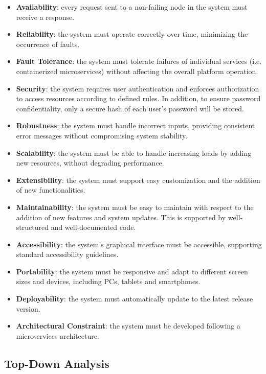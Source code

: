 \begin{itemize}
  \item \textbf{Availability}: every request sent to a non-failing node in the system must receive a response.
  \item \textbf{Reliability}: the system must operate correctly over time, minimizing the occurrence of faults.
  \item \textbf{Fault Tolerance}: the system must tolerate failures of individual services (i.e. containerized microservices) without affecting the overall platform operation.
  \item \textbf{Security}: the system requires user authentication and enforces authorization to access resources according to defined rules. In addition, to ensure password confidentiality, only a secure hash of each user's password will be stored.
  \item \textbf{Robustness}: the system must handle incorrect inputs, providing consistent error messages without compromising system stability.
  \item \textbf{Scalability}: the system must be able to handle increasing loads by adding new resources, without degrading performance.
  \item \textbf{Extensibility}: the system must support easy customization and the addition of new functionalities.
  \item \textbf{Maintainability}: the system must be easy to maintain with respect to the addition of new features and system updates. This is supported by well-structured and well-documented code.
  \item \textbf{Accessibility}: the system's graphical interface must be accessible, supporting standard accessibility guidelines.
  \item \textbf{Portability}: the system must be responsive and adapt to different screen sizes and devices, including PCs, tablets and smartphones.
  \item \textbf{Deployability}: the system must automatically update to the latest release version.
  \item \textbf{Architectural Constraint}: the system must be developed following a microservices architecture.
\end{itemize}

\subsection{Top-Down Analysis}

